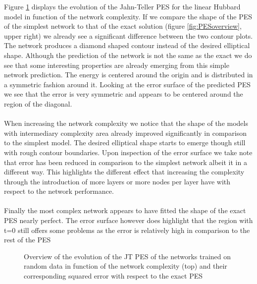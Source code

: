 \documentclass[12pt]{article}
\begin{document}
Figure \ref{fig:JT_random} displays the evolution of the Jahn-Teller PES for the linear Hubbard model in function of the network complexity. If we compare the shape of the PES of the simplest network to that of the exact solution (figure \ref{fig:PESoverview}, upper right) we already see a significant difference between the two contour plots. The network produces a diamond shaped contour instead of the desired elliptical shape. Although the prediction of the network is not the same as the exact we do see that some interesting properties are already emerging from this simple network prediction. The energy is centered around the origin and is distributed in a symmetric fashion around it. Looking at the error surface of the predicted PES we see that the error is very symmetric and appears to be centered around the region of the diagonal. 
\\
\\
When increasing the network complexity we notice that the shape of the models with intermediary complexity area already improved significantly in comparison to the simplest model. The desired elliptical shape starts to emerge though still with rough contour boundaries. Upon inspection of the error surface we take note that error has been reduced in comparison to the simplest network albeit it in a different way. This highlights the different effect that increasing the complexity through the introduction of more layers or more nodes per layer have with respect to the network performance.
\\
\\
Finally the most complex network appears to have fitted the shape of the exact PES nearly perfect. The error surface however does highlight that the region with t=0 still offers some problems as the error is relatively high in comparison to the rest of the PES  
\begin{figure}[H]
	\centering
	\begin{subfigure}
		\texttt{[image: "Linear\_JT\_random"]}
	\end{subfigure}
	\begin{subfigure}
		\texttt{[image: "Linear\_JT\_MSE\_random"]}
	\end{subfigure}
	\caption{Overview of the evolution of the JT PES of the networks trained on random data in function of the network complexity (top) and their corresponding squared error with respect to the exact PES}
	\label{fig:JT_random}	
\end{figure}
\end{document}

